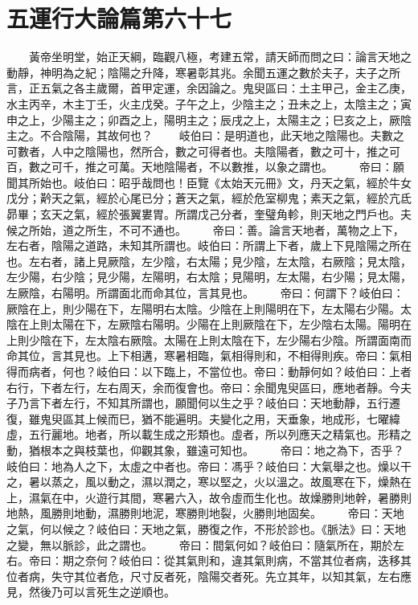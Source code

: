 \section{五運行大論篇第六十七}

　　黃帝坐明堂，始正天綱，臨觀八極，考建五常，請天師而問之曰：論言天地之動靜，神明為之紀；陰陽之升降，寒暑彰其兆。余聞五運之數於夫子，夫子之所言，正五氣之各主歲爾，首甲定運，余因論之。鬼臾區曰：土主甲己，金主乙庚，水主丙辛，木主丁壬，火主戊癸。子午之上，少陰主之；丑未之上，太陰主之；寅申之上，少陽主之；卯酉之上，陽明主之；辰戌之上，太陽主之；巳亥之上，厥陰主之。不合陰陽，其故何也？
　　岐伯曰：是明道也，此天地之陰陽也。夫數之可數者，人中之陰陽也，然所合，數之可得者也。夫陰陽者，數之可十，推之可百，數之可千，推之可萬。天地陰陽者，不以數推，以象之謂也。
　　帝曰：願聞其所始也。岐伯曰：昭乎哉問也！臣覽《太始天元冊》文，丹天之氣，經於牛女戊分；黅天之氣，經於心尾已分；蒼天之氣，經於危室柳鬼；素天之氣，經於亢氐昴畢；玄天之氣，經於張翼婁胃。所謂戊己分者，奎璧角軫，則天地之門戶也。夫候之所始，道之所生，不可不通也。
　　帝曰：善。論言天地者，萬物之上下，左右者，陰陽之道路，未知其所謂也。岐伯曰：所謂上下者，歲上下見陰陽之所在也。左右者，諸上見厥陰，左少陰，右太陽；見少陰，左太陰，右厥陰；見太陰，左少陽，右少陰；見少陽，左陽明，右太陰；見陽明，左太陽，右少陽；見太陽，左厥陰，右陽明。所謂面北而命其位，言其見也。
　　帝曰：何謂下？岐伯曰：厥陰在上，則少陽在下，左陽明右太陰。少陰在上則陽明在下，左太陽右少陽。太陰在上則太陽在下，左厥陰右陽明。少陽在上則厥陰在下，左少陰右太陽。陽明在上則少陰在下，左太陰右厥陰。太陽在上則太陰在下，左少陽右少陰。所謂面南而命其位，言其見也。上下相遘，寒暑相臨，氣相得則和，不相得則疾。帝曰：氣相得而病者，何也？岐伯曰：以下臨上，不當位也。帝曰：動靜何如？岐伯曰：上者右行，下者左行，左右周天，余而復會也。帝曰：余聞鬼臾區曰，應地者靜。今夫子乃言下者左行，不知其所謂也，願聞何以生之乎？岐伯曰：天地動靜，五行遷復，雖鬼臾區其上候而巳，猶不能遍明。夫變化之用，天垂象，地成形，七曜緯虛，五行麗地。地者，所以載生成之形類也。虛者，所以列應天之精氣也。形精之動，猶根本之與枝葉也，仰觀其象，雖遠可知也。
　　帝曰：地之為下，否乎？岐伯曰：地為人之下，太虛之中者也。帝曰：馮乎？岐伯曰：大氣舉之也。燥以干之，暑以蒸之，風以動之，濕以潤之，寒以堅之，火以溫之。故風寒在下，燥熱在上，濕氣在中，火遊行其間，寒暑六入，故令虛而生化也。故燥勝則地幹，暑勝則地熱，風勝則地動，濕勝則地泥，寒勝則地裂，火勝則地固矣。
　　帝曰：天地之氣，何以候之？岐伯曰：天地之氣，勝復之作，不形於診也。《脈法》曰：天地之變，無以脈診，此之謂也。
　　帝曰：間氣何如？岐伯曰：隨氣所在，期於左右。帝曰：期之奈何？岐伯曰：從其氣則和，違其氣則病，不當其位者病，迭移其位者病，失守其位者危，尺寸反者死，陰陽交者死。先立其年，以知其氣，左右應見，然後乃可以言死生之逆順也。
